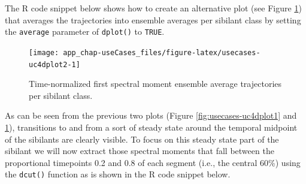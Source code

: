 \documentclass[]{book}
\newenvironment{Shaded}{\begin{snugshade}}{\end{snugshade}}
\newcommand{\CommentTok}[1]{\textcolor[rgb]{0.56,0.35,0.01}{\textit{#1}}}
\newcommand{\DataTypeTok}[1]{\textcolor[rgb]{0.13,0.29,0.53}{#1}}
\newcommand{\DecValTok}[1]{\textcolor[rgb]{0.00,0.00,0.81}{#1}}
\newcommand{\FloatTok}[1]{\textcolor[rgb]{0.00,0.00,0.81}{#1}}
\newcommand{\KeywordTok}[1]{\textcolor[rgb]{0.13,0.29,0.53}{\textbf{#1}}}
\newcommand{\NormalTok}[1]{#1}
\newcommand{\OperatorTok}[1]{\textcolor[rgb]{0.81,0.36,0.00}{\textbf{#1}}}
\newcommand{\OtherTok}[1]{\textcolor[rgb]{0.56,0.35,0.01}{#1}}
\newcommand{\StringTok}[1]{\textcolor[rgb]{0.31,0.60,0.02}{#1}}
\theoremstyle{definition}
\theoremstyle{definition}
\theoremstyle{definition}
\theoremstyle{remark}
\begin{document}
The R code snippet below shows how to create an alternative plot (see
Figure \ref{fig:usecases-uc4dplot2}) that averages the trajectories into
ensemble averages per sibilant class by setting the \texttt{average}
parameter of \texttt{dplot()} to \texttt{TRUE}.

\begin{Shaded}
\end{Shaded}

\begin{figure}

{\centering \texttt{[image: app\_chap-useCases\_files/figure-latex/usecases-uc4dplot2-1]} 

}

\caption{Time-normalized first spectral moment ensemble average trajectories per sibilant class.}\label{fig:usecases-uc4dplot2}
\end{figure}

As can be seen from the previous two plots (Figure
\ref{fig:usecases-uc4dplot1} and \ref{fig:usecases-uc4dplot2}),
transitions to and from a sort of steady state around the temporal
midpoint of the sibilants are clearly visible. To focus on this steady
state part of the sibilant we will now extract those spectral moments
that fall between the proportional timepoints 0.2 and 0.8 of each
segment (i.e., the central 60\%) using the \texttt{dcut()} function as
is shown in the R code snippet below.

\begin{Shaded}
\end{Shaded}
\end{document}
